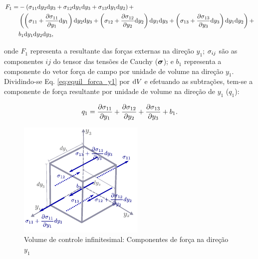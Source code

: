 \documentclass[tese_patricia]{subfiles}%
\begin{document}
\begin{align}
	\begin{split}
	F_1 =& -\left(\sigma_{11}\mathrm{d} y_2 \mathrm{d} y_3 + \sigma_{12}\mathrm{d} y_1 \mathrm{d} y_3 + \sigma_{13}\mathrm{d} y_1 \mathrm{d} y_2\right) + \\ & \left(\left(\sigma_{11} + \frac{\partial \sigma_{11}}{\partial y_1}\mathrm{d} y_1 \right)\mathrm{d} y_2 \mathrm{d} y_3 + \left(\sigma_{12}+ \frac{\partial \sigma_{12}}{\partial y_2}\mathrm{d} y_2\right)\mathrm{d} y_1 \mathrm{d} y_3 + \left(\sigma_{13}+ \frac{\partial \sigma_{13}}{\partial y_3}\mathrm{d} y_3\right)\mathrm{d} y_1 \mathrm{d} y_2\right) + \\& b_{1}\mathrm{d} y_1 \mathrm{d} y_2 \mathrm{d} y_3, \label{eq:equil_forca_y1} 
	\end{split}
\end{align}	

\noindent onde $F_1$ representa a resultante das forças externas na direção $y_1$; $\sigma_{ij}$ são as componentes $ij$ do tensor das tensões de Cauchy ($\boldsymbol{\sigma}$); e $b_1$ representa a componente do vetor força de campo por unidade de volume na direção $y_1$. Dividindo-se Eq. \ref{eq:equil_forca_y1} por $\mathrm{d} V$ e efetuando as subtrações, tem-se a componente de força resultante por unidade de volume na direção de $y_1$ ($q_1$):

\begin{align}
		q_1 =\frac{\partial \sigma_{11}}{\partial y_1} + \frac{\partial \sigma_{12}}{\partial y_2} + \frac{\partial \sigma_{13}}{\partial y_3} + b_{1}.
\end{align}	

\begin{figure}[htb!]
	\centering 
	\includegraphics[scale=1.5,trim=0cm 0.0cm 0cm 0.0cm, clip=true]{Imagens/Cap2/volInf_tensao.pdf}	
	\caption{Volume de controle infinitesimal: Componentes de força na direção $y_1$}
	\label{fig:volInf_tensao}
\end{figure}
\end{document}
